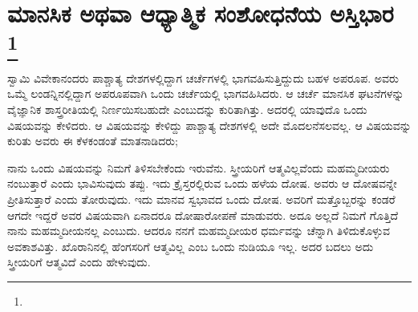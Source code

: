 
\chapter[ಮಾನಸಿಕ ಅಥವಾ ಆಧ್ಯಾತ್ಮಿಕ ಸಂಶೋಧನೆಯ ಅಸ್ತಿಭಾರ ]{ಮಾನಸಿಕ ಅಥವಾ ಆಧ್ಯಾತ್ಮಿಕ ಸಂಶೋಧನೆಯ ಅಸ್ತಿಭಾರ \protect\footnote{}}

ಸ್ವಾಮಿ ವಿವೇಕಾನಂದರು ಪಾಶ್ಚಾತ್ಯ ದೇಶಗಳಲ್ಲಿದ್ದಾಗ ಚರ್ಚೆಗಳಲ್ಲಿ ಭಾಗವಹಿಸುತ್ತಿದ್ದುದು ಬಹಳ ಅಪರೂಪ. ಅವರು ಒಮ್ಮೆ ಲಂಡನ್ನಿನಲ್ಲಿದ್ದಾಗ ಅಪರೂಪವಾಗಿ ಒಂದು ಚರ್ಚೆಯಲ್ಲಿ ಭಾಗವಹಿಸಿದರು. ಆ ಚರ್ಚೆ ಮಾನಸಿಕ ಘಟನೆಗಳನ್ನು ವೈಜ್ಞಾನಿಕ ಶಾಸ್ತ್ರರೀತಿಯಲ್ಲಿ ನಿರ್ಣಯಿಸಬಹುದೇ ಎಂಬುದನ್ನು ಕುರಿತಾಗಿತ್ತು. ಅದರಲ್ಲಿ ಯಾವುದೊ ಒಂದು ವಿಷಯವನ್ನು ಕೇಳಿದರು. ಆ ವಿಷಯವನ್ನು ಕೇಳಿದ್ದು ಪಾಶ್ಚಾತ್ಯ ದೇಶಗಳಲ್ಲಿ ಅದೇ ಮೊದಲನೆ\break ಸಲವಲ್ಲ. ಆ ವಿಷಯವನ್ನು ಕುರಿತು ಅವರು ಈ ಕೆಳಕಂಡಂತೆ ಮಾತನಾಡಿದರು;

ನಾನು ಒಂದು ವಿಷಯವನ್ನು ನಿಮಗೆ ತಿಳಿಸಬೇಕೆಂದು ಇರುವೆನು. ಸ್ತ್ರೀಯರಿಗೆ ಆತ್ಮವಿಲ್ಲವೆಂದು ಮಹಮ್ಮದೀಯರು ನಂಬುತ್ತಾರೆ ಎಂದು ಭಾವಿಸುವುದು ತಪ್ಪು. ಇದು ಕ್ರೈಸ್ತರಲ್ಲಿರುವ ಒಂದು ಹಳೆಯ ದೋಷ. ಅವರು ಆ ದೋಷವನ್ನೇ ಪ್ರೀತಿಸುತ್ತಾರೆ ಎಂದು ತೋರುವುದು. ಇದು ಮಾನವ ಸ್ವಭಾವದ ಒಂದು ದೋಷ. ಅವರಿಗೆ ಮತ್ತೊಬ್ಬರನ್ನು ಕಂಡರೆ ಆಗದೇ ಇದ್ದರೆ ಅವರ ವಿಷಯವಾಗಿ ಏನಾದರೂ ದೋಷಾರೋಪಣೆ ಮಾಡುವರು. ಅದೂ ಅಲ್ಲದೆ ನಿಮಗೆ ಗೊತ್ತಿದೆ ನಾನು ಮಹಮ್ಮದೀಯನಲ್ಲ ಎಂಬುದು. ಆದರೂ ನನಗೆ ಮಹಮ್ಮದೀಯರ ಧರ್ಮವನ್ನು ಚೆನ್ನಾಗಿ ತಿಳಿದುಕೊಳ್ಳುವ ಅವಕಾಶವಿತ್ತು. ಖೊರಾನಿನಲ್ಲಿ ಹೆಂಗಸರಿಗೆ ಆತ್ಮವಿಲ್ಲ ಎಂಬ ಒಂದು ನುಡಿಯೂ ಇಲ್ಲ. ಅದರ ಬದಲು ಅದು ಸ್ತ್ರೀಯರಿಗೆ ಆತ್ಮವಿದೆ ಎಂದು ಹೇಳುವುದು.

